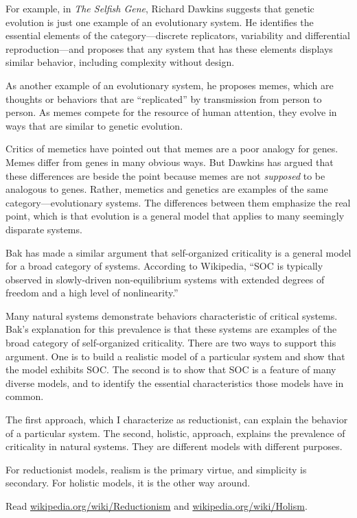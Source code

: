 \documentclass[10pt]{book}
\begin{document}
For example, in {\em The Selfish Gene}, Richard Dawkins suggests that
genetic evolution is just one example of an evolutionary system.  He
identifies the essential elements of the category---discrete
replicators, variability and differential reproduction---and proposes
that any system that has these elements displays similar
behavior, including complexity without design.

As another example of an evolutionary system, he proposes memes, which
are thoughts or behaviors that are ``replicated'' by transmission from
person to person.  As memes compete for the resource of human
attention, they evolve in ways that are similar to genetic evolution.

Critics of memetics have pointed out that memes are a poor analogy
for genes.  Memes differ from genes in many obvious ways.  But
Dawkins has argued that these differences are beside the point
because memes are not {\em supposed} to be analogous to genes.
Rather, memetics and genetics are examples of the same
category---evolutionary systems.  The differences between them
emphasize the real point, which is that evolution is a general model
that applies to many seemingly disparate systems.

Bak has made a similar argument that self-organized criticality is a
general model for a broad category of systems.  According to
Wikipedia, ``SOC is typically observed in slowly-driven
non-equilibrium systems with extended degrees of freedom and a high
level of nonlinearity.''

Many natural systems demonstrate behaviors characteristic of critical
systems.  Bak's explanation for this prevalence is that these systems
are examples of the broad category of self-organized criticality.
There are two ways to support this argument.  One is to build
a realistic model of a particular system and show that the model
exhibits SOC.  The second is to show that SOC is a feature of many
diverse models, and to identify the essential characteristics
those models have in common.

The first approach, which I characterize as reductionist,
can explain the behavior of a particular system.  The
second, holistic, approach, explains the prevalence of
criticality in natural systems.  They are different models
with different purposes.

For reductionist models, realism is the primary virtue, and
simplicity is secondary.  For holistic models, it is the other
way around.

\begin{ex}

Read \url{wikipedia.org/wiki/Reductionism}
and \url{wikipedia.org/wiki/Holism}.

\end{ex}
\end{document}

